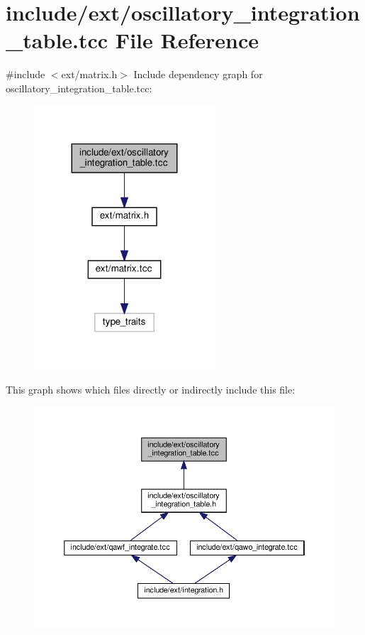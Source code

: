 \hypertarget{oscillatory__integration__table_8tcc}{}\section{include/ext/oscillatory\+\_\+integration\+\_\+table.tcc File Reference}
\label{oscillatory__integration__table_8tcc}
{\ttfamily \#include $<$ext/matrix.\+h$>$}\newline
Include dependency graph for oscillatory\+\_\+integration\+\_\+table.\+tcc\+:
\nopagebreak
\begin{figure}[H]
\begin{center}
\leavevmode
\includegraphics[width=191pt]{oscillatory__integration__table_8tcc__incl}
\end{center}
\end{figure}
This graph shows which files directly or indirectly include this file\+:
\nopagebreak
\begin{figure}[H]
\begin{center}
\leavevmode
\includegraphics[width=350pt]{oscillatory__integration__table_8tcc__dep__incl}
\end{center}
\end{figure}

